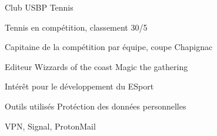 

\begin{cventries}

  \cventry
    {Club USBP} %
    {Tennis} %
    {} %
    {} %
    {
      \begin{cvitems} %
        \item {Tennis en compétition, classement 30/5}
        \item {Capitaine de la compétition par équipe, coupe Chapignac}
      \end{cvitems}
    }

  \cventry
    {Editeur Wizzards of the coast} %
    {Magic the gathering} %
    {} %
    {} %
    {
      \begin{cvitems} %
        \item {Intérêt pour le développement du ESport}
      \end{cvitems}
    }

  \cventry
    {Outils utilisés} %
    {Protéction des données personnelles} %
    {} %
    {} %
    {
      \begin{cvitems} %
        \item {VPN, Signal, ProtonMail}
      \end{cvitems}
    }

\end{cventries}
